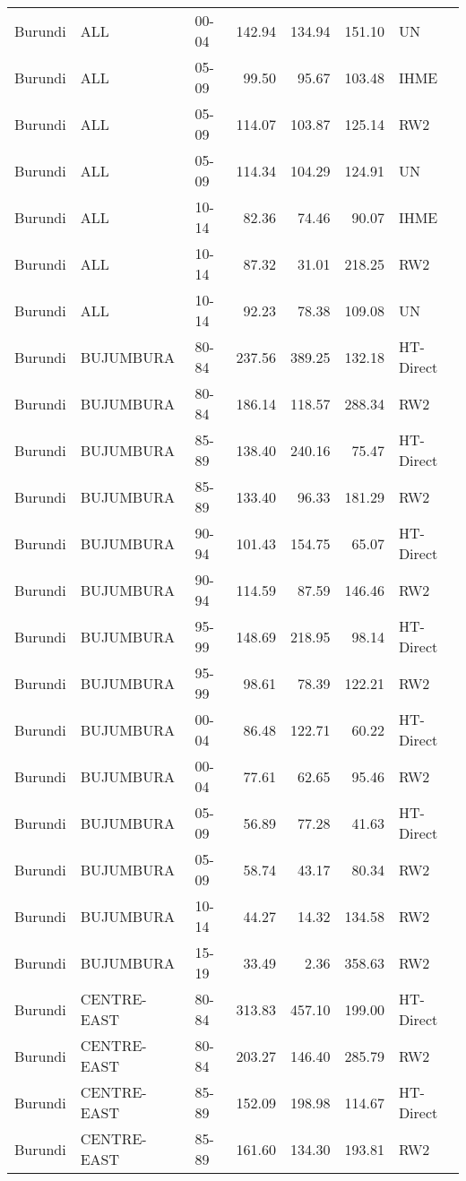\begin{longtable}{lllrrrl}
  Burundi & ALL & 00-04 & 142.94 & 134.94 & 151.10 & UN \\ 
  Burundi & ALL & 05-09 & 99.50 & 95.67 & 103.48 & IHME \\ 
  Burundi & ALL & 05-09 & 114.07 & 103.87 & 125.14 & RW2 \\ 
  Burundi & ALL & 05-09 & 114.34 & 104.29 & 124.91 & UN \\ 
  Burundi & ALL & 10-14 & 82.36 & 74.46 & 90.07 & IHME \\ 
  Burundi & ALL & 10-14 & 87.32 & 31.01 & 218.25 & RW2 \\ 
  Burundi & ALL & 10-14 & 92.23 & 78.38 & 109.08 & UN \\ 
  Burundi & BUJUMBURA & 80-84 & 237.56 & 389.25 & 132.18 & HT-Direct \\ 
  Burundi & BUJUMBURA & 80-84 & 186.14 & 118.57 & 288.34 & RW2 \\ 
  Burundi & BUJUMBURA & 85-89 & 138.40 & 240.16 & 75.47 & HT-Direct \\ 
  Burundi & BUJUMBURA & 85-89 & 133.40 & 96.33 & 181.29 & RW2 \\ 
  Burundi & BUJUMBURA & 90-94 & 101.43 & 154.75 & 65.07 & HT-Direct \\ 
  Burundi & BUJUMBURA & 90-94 & 114.59 & 87.59 & 146.46 & RW2 \\ 
  Burundi & BUJUMBURA & 95-99 & 148.69 & 218.95 & 98.14 & HT-Direct \\ 
  Burundi & BUJUMBURA & 95-99 & 98.61 & 78.39 & 122.21 & RW2 \\ 
  Burundi & BUJUMBURA & 00-04 & 86.48 & 122.71 & 60.22 & HT-Direct \\ 
  Burundi & BUJUMBURA & 00-04 & 77.61 & 62.65 & 95.46 & RW2 \\ 
  Burundi & BUJUMBURA & 05-09 & 56.89 & 77.28 & 41.63 & HT-Direct \\ 
  Burundi & BUJUMBURA & 05-09 & 58.74 & 43.17 & 80.34 & RW2 \\ 
  Burundi & BUJUMBURA & 10-14 & 44.27 & 14.32 & 134.58 & RW2 \\ 
  Burundi & BUJUMBURA & 15-19 & 33.49 & 2.36 & 358.63 & RW2 \\ 
  Burundi & CENTRE-EAST & 80-84 & 313.83 & 457.10 & 199.00 & HT-Direct \\ 
  Burundi & CENTRE-EAST & 80-84 & 203.27 & 146.40 & 285.79 & RW2 \\ 
  Burundi & CENTRE-EAST & 85-89 & 152.09 & 198.98 & 114.67 & HT-Direct \\ 
  Burundi & CENTRE-EAST & 85-89 & 161.60 & 134.30 & 193.81 & RW2 \\ 

\end{longtable}
